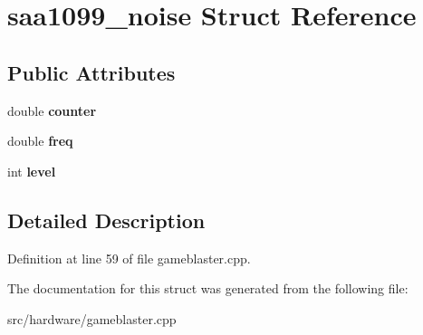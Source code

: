 \hypertarget{structsaa1099__noise}{\section{saa1099\-\_\-noise Struct Reference}
\label{structsaa1099__noise}
}
\subsection*{Public Attributes}
\begin{DoxyCompactItemize}
\item 
\hypertarget{structsaa1099__noise_a6628c1568359cbfbdb7a0e75581ef3a7}{double {\bfseries counter}}\label{structsaa1099__noise_a6628c1568359cbfbdb7a0e75581ef3a7}

\item 
\hypertarget{structsaa1099__noise_a91ef687a996e85ed659442e95d29f120}{double {\bfseries freq}}\label{structsaa1099__noise_a91ef687a996e85ed659442e95d29f120}

\item 
\hypertarget{structsaa1099__noise_a400c62c80f70f63e69f3990bf0ba6f05}{int {\bfseries level}}\label{structsaa1099__noise_a400c62c80f70f63e69f3990bf0ba6f05}

\end{DoxyCompactItemize}


\subsection{Detailed Description}


Definition at line 59 of file gameblaster.\-cpp.



The documentation for this struct was generated from the following file\-:\begin{DoxyCompactItemize}
\item 
src/hardware/gameblaster.\-cpp\end{DoxyCompactItemize}
